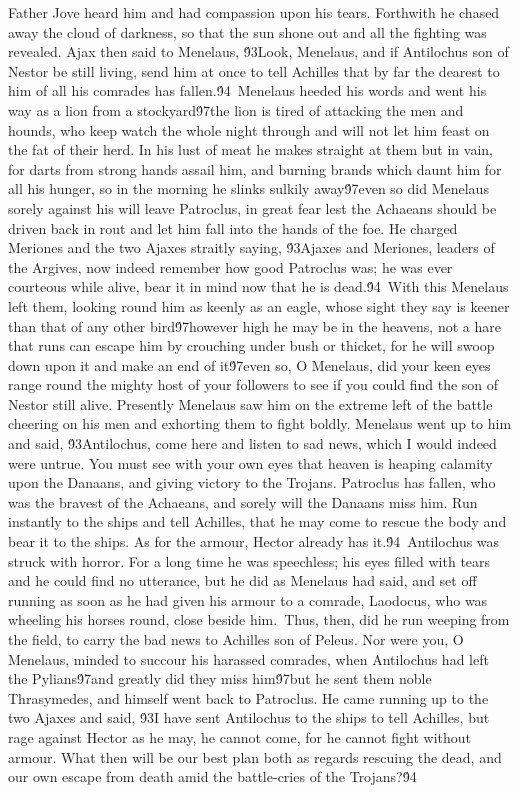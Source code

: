 {Father Jove heard him and had compassion upon his tears. Forthwith he chased away the cloud of darkness, so that the sun shone out and all the fighting was revealed. Ajax then said to Menelaus, \'93Look, Menelaus, and if Antilochus son of Nestor be still living, send him at once to tell Achilles that by far the dearest to him of all his comrades has fallen.\'94\
Menelaus heeded his words and went his way as a lion from a stockyard\'97the lion is tired of attacking the men and hounds, who keep watch the whole night through and will not let him feast on the fat of their herd. In his lust of meat he makes straight at them but in vain, for darts from strong hands assail him, and burning brands which daunt him for all his hunger, so in the morning he slinks sulkily away\'97even so did Menelaus sorely against his will leave Patroclus, in great fear lest the Achaeans should be driven back in rout and let him fall into the hands of the foe. He charged Meriones and the two Ajaxes straitly saying, \'93Ajaxes and Meriones, leaders of the Argives, now indeed remember how good Patroclus was; he was ever courteous while alive, bear it in mind now that he is dead.\'94\
With this Menelaus left them, looking round him as keenly as an eagle, whose sight they say is keener than that of any other bird\'97however high he may be in the heavens, not a hare that runs can escape him by crouching under bush or thicket, for he will swoop down upon it and make an end of it\'97even so, O Menelaus, did your keen eyes range round the mighty host of your followers to see if you could find the son of Nestor still alive. Presently Menelaus saw him on the extreme left of the battle cheering on his men and exhorting them to fight boldly. Menelaus went up to him and said, \'93Antilochus, come here and listen to sad news, which I would indeed were untrue. You must see with your own eyes that heaven is heaping calamity upon the Danaans, and giving victory to the Trojans. Patroclus has fallen, who was the bravest of the Achaeans, and sorely will the Danaans miss him. Run instantly to the ships and tell Achilles, that he may come to rescue the body and bear it to the ships. As for the armour, Hector already has it.\'94\
Antilochus was struck with horror. For a long time he was speechless; his eyes filled with tears and he could find no utterance, but he did as Menelaus had said, and set off running as soon as he had given his armour to a comrade, Laodocus, who was wheeling his horses round, close beside him.\
Thus, then, did he run weeping from the field, to carry the bad news to Achilles son of Peleus. Nor were you, O Menelaus, minded to succour his harassed comrades, when Antilochus had left the Pylians\'97and greatly did they miss him\'97but he sent them noble Thrasymedes, and himself went back to Patroclus. He came running up to the two Ajaxes and said, \'93I have sent Antilochus to the ships to tell Achilles, but rage against Hector as he may, he cannot come, for he cannot fight without armour. What then will be our best plan both as regards rescuing the dead, and our own escape from death amid the battle-cries of the Trojans?\'94\
}
